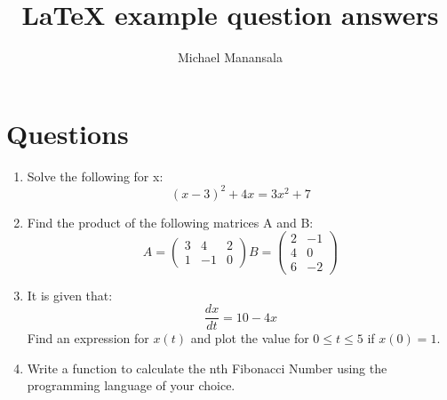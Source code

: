 \documentclass[11pt, a4paper]{article}
\title{LaTeX example question answers}
\author{Michael Manansala}
\begin{document}
	
	\maketitle
	
	\tableofcontents
	\pagebreak
	
	\section{Questions}
	\begin{enumerate}
		\item Solve the following for x:\\ %
		\begin{equation*} %
		(x-3)^2+4x=3x^2+7
		\end{equation*}
		\item Find the product of the following matrices A and B:\\
		\begin{equation*}
		A=\begin{pmatrix}
		3 & 4 & 2 \\
		1 & -1 & 0
		\end{pmatrix}
		B=\begin{pmatrix}
		2 & -1 \\
		4 & 0  \\
		6 & -2
		\end{pmatrix}
		\end{equation*}
		\item It is given that:\\
		\begin{equation*}
		\frac{dx}{dt}=10-4x
		\end{equation*}
		Find an expression for $x(t)$ and plot the value for $0\leq t\leq 5$ if $x(0)=1$.
		\item Write a function to calculate the nth Fibonacci Number using the programming language of your choice.
	\end{enumerate}
	
\end{document}
